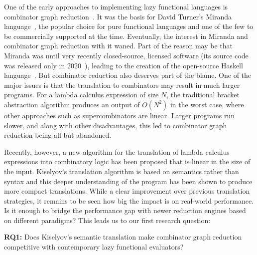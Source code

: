 \documentclass[conference]{IEEEtran}
\begin{document}
One of the early approaches to implementing lazy functional languages is combinator graph reduction~\cite{turner_new_1979}.
It was the basis for David Turner's Miranda language~\cite{turner_miranda_1985}, the popular choice for pure functional languages and one of the few to be commercially supported at the time.
Eventually, the interest in Miranda and combinator graph reduction with it waned.
Part of the reason may be that Miranda was until very recently closed-source, licensed software (its source code was released only in 2020~\cite{noauthor_open_2021}), leading to the creation of the open-source Haskell language~\cite{hudak_history_2007}.
But combinator reduction also deserves part of the blame.
One of the major issues is that the translation to combinators may result in much larger programs.
For a lambda calculus expression of size $N$, the traditional bracket abstraction algorithm produces an output of $O(N^2)$ in the worst case, where other approaches such as supercombinators are linear\cite{spj_impl}.
Larger programs run slower, and along with other disadvantages, this led to combinator graph reduction being all but abandoned.

Recently, however, a new algorithm for the translation of lambda calculus expressions into combinatory logic has been proposed that is linear in the size of the input\cite{kiselyov_lambda_2018}.
Kiselyov's translation algorithm is based on semantics rather than syntax and this deeper understanding of the program has been shown to produce more compact translations.
While a clear improvement over previous translation strategies, it remains to be seen how big the impact is on real-world performance.
Is it enough to bridge the performance gap with newer reduction engines based on different paradigms?
This leads us to our first research question:

\textbf{RQ1:} Does Kiselyov's semantic translation make combinator graph reduction competitive with contemporary lazy functional evaluators?
\end{document}

